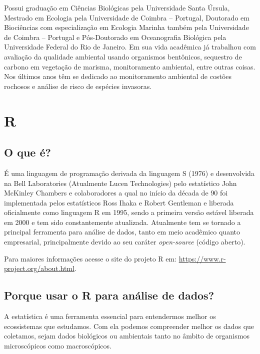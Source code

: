 \documentclass[14pt,titlepage, oneside, openany, a4paper]{book}
\begin{document}
Possui graduação em Ciências Biológicas pela Universidade Santa Úrsula, Mestrado em Ecologia pela Universidade de Coimbra -- Portugal, Doutorado em Biociências com especialização em Ecologia Marinha também pela Universidade de Coimbra -- Portugal e Pós-Doutorado em Oceanografia Biológica pela Universidade Federal do Rio de Janeiro. Em sua vida acadêmica já trabalhou com avaliação da qualidade ambiental usando organismos bentônicos, sequestro de carbono em vegetação de marisma, monitoramento ambiental, entre outras coisas. Nos últimos anos têm se dedicado ao monitoramento ambiental de costões rochosos e análise de risco de espécies invasoras.

\hypertarget{r}{%
\chapter{R}\label{r}}

\hypertarget{o-que-uxe9}{%
\section{O que é?}\label{o-que-uxe9}}

É uma linguagem de programação derivada da linguagem S (1976) e desenvolvida na Bell Laboratories (Atualmente Lucen Technologies) pelo estatístico John McKinley Chambers e colaboradores a qual no início da década de 90 foi implementada pelos estatísticos Ross Ihaka e Robert Gentleman e liberada oficialmente como linguagem R em 1995, sendo a primeira versão estável liberada em 2000 e tem sido constantemente atualizada. Atualmente tem se tornado a principal ferramenta para análise de dados, tanto em meio acadêmico quanto empresarial, principalmente devido ao seu caráter \emph{open-source} (código aberto).

Para maiores informações acesse o site do projeto R em: \url{https://www.r-project.org/about.html}.

\hypertarget{porque-usar-o-r-para-anuxe1lise-de-dados}{%
\section{Porque usar o R para análise de dados?}\label{porque-usar-o-r-para-anuxe1lise-de-dados}}

A estatística é uma ferramenta essencial para entendermos melhor os ecossistemas que estudamos. Com ela podemos compreender melhor os dados que coletamos, sejam dados biológicos ou ambientais tanto no âmbito de organismos microscópicos como macroscópicos.
\end{document}
